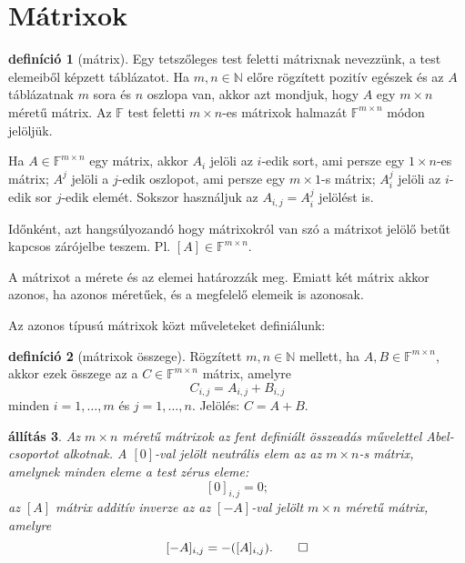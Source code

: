 \documentclass[a4paper, showtrims]{memoir}
\theoremstyle{plain}
\newtheorem{proposition}{állítás}[chapter]
\theoremstyle{remark}
\theoremstyle{definition}
\newtheorem{definition}[proposition]{definíció}
\begin{document}
\section{Mátrixok}
\begin{definition}[mátrix]
	Egy tetszőleges test feletti mátrixnak nevezzünk,
	a test elemeiből képzett táblázatot.
	Ha $m,n\in\mathbb{N}$ előre rögzített pozitív egészek és
	az $A$ táblázatnak $m$ sora és $n$ oszlopa van,
	akkor azt mondjuk, hogy $A$ egy $m\times n$ méretű mátrix.
	Az $\mathbb{F}$ test feletti $m\times n$-es mátrixok halmazát $\mathbb{F}^{m\times n}$
	módon jelöljük.

	Ha $A\in\mathbb{F}^{m\times n}$ egy mátrix,
	akkor $A_i$ jelöli az $i$-edik sort, ami persze egy $1\times n$-es mátrix;
	$A^j$ jelöli a $j$-edik oszlopot, ami persze egy $m\times 1$-s mátrix;
	$A_i^j$ jelöli az $i$-edik sor $j$-edik elemét.
	Sokszor használjuk az $A_{i,j}=A_i^j$ jelölést is.

	Időnként, azt hangsúlyozandó hogy mátrixokról van szó a mátrixot jelölő betűt kapcsos zárójelbe teszem.
	Pl. $\left[ A \right]\in\mathbb{F}^{m\times n}$.

	A mátrixot a mérete és az elemei határozzák meg.
	Emiatt két mátrix akkor azonos, ha azonos méretűek, és a megfelelő elemeik is azonosak.
\end{definition}
Az azonos típusú mátrixok közt műveleteket definiálunk:
\begin{definition}[mátrixok összege]
	Rögzített $m,n\in\mathbb{N}$ mellett, ha $A,B\in\mathbb{F}^{m\times n}$,
	akkor ezek összege az a $C\in\mathbb{F}^{m\times n}$ mátrix, amelyre
	\[
		C_{i,j}=A_{i,j}+B_{i,j}
	\]
	minden $i=1,\ldots,m$ és $j=1,\ldots, n$.
	Jelölés: $C=A+B$.
\end{definition}
\begin{proposition}\label{pr:matrixokVS1}
	Az $m\times n$ méretű mátrixok az fent definiált összeadás művelettel
	Abel-csoportot alkotnak.
	A $[0]$-val jelölt neutrális elem az az $m\times n$-s mátrix,
	amelynek minden eleme a test zérus eleme:
	\[
		[0]_{i,j}=0;
	\]
	az $[A]$ mátrix additív inverze az az $[-A]$-val jelölt $m\times n$ méretű mátrix,
	amelyre
	\[
		[-A]_{i,j}=-([A]_{i,j}).\qedhere
	\]
\end{proposition}
\end{document}
